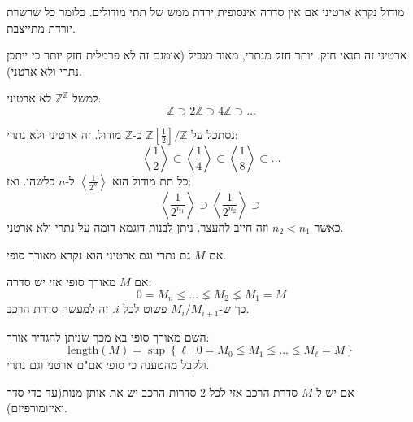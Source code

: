 \documentclass{tstextbook}
\begin{document}
\begin{definition}
מודול נקרא ארטיני אם אין סדרה אינסופית ירדת ממש של תתי מודולים. כלומר כל שרשרת יורדת מתייצבת.

\end{definition}
\begin{remark}
ארטיני זה תנאי חזק. יותר חזק מנתרי, מאוד מגביל (אומנם זה לא פרמלית חזק יותר כי ייתכן נתרי ולא ארטני).

\end{remark}
\begin{example}
למשל \(\mathbb{Z}^{\mathbb{Z}}\) לא ארטיני:
$$\mathbb{Z}\supset 2\mathbb{Z} \supset 4\mathbb{Z}\supset \dots$$

\end{example}
\begin{example}
נסתכל על \(\mathbb{Z}\left[ \frac{1}{2} \right] / \mathbb{Z}\) כ-\(\mathbb{Z}\) מודול. זה ארטיני ולא נתרי:
$$\left\langle  \frac{1}{2}  \right\rangle \subset \left\langle  \frac{1}{4}  \right\rangle \subset \left\langle  \frac{1}{8}  \right\rangle \subset \dots$$
כל תת מודול הוא \(\left\langle  \frac{1}{2^{n}}  \right\rangle\) ל-\(n\) כלשהו. ואז:
$$\left\langle  \frac{1}{2^{n_{1}}}  \right\rangle \supset \left\langle  \frac{1}{2^{n_{2}}}  \right\rangle\supset $$
כאשר \(n_{2}< n_{1}\) וזה חייב להעצר. ניתן לבנות דוגמא דומה על נתרי ולא ארטני.

\end{example}
\begin{definition}
אם \(M\) גם נתרי וגם ארטיני הוא נקרא מאורך סופי.

\end{definition}
\begin{proposition}
אם \(M\) מאורך סופי אזי יש סדרה:
$$0=M_{n}\leq  \dots \lneq M_{2} \lneq  M_{1}=M$$
כך ש-\(M_{i} / M_{i+1}\) פשוט לכל \(i\).  זה למעשה סדרת הרכב.

\end{proposition}
\begin{remark}
השם מאורך סופי בא מכך שניתן להגדיר אורך:
$$\mathrm{{length}}\left(M\right)=\operatorname*{sup}\left\{\ell\,|\,0=M_{0}\lneq M_{1}\lneq\ldots\lneq M_{\ell}=M\right\}$$
ולקבל מהטענה כי סופי אם"ם ארטני וגם נתרי.

\end{remark}
\begin{theorem}
אם יש ל-\(M\) סדרת הרכב אזי לכל 2 סדרות הרכב יש את אותן מנות(עד כדי סדר ואיזומורפיזם). 

\end{theorem}
\end{document}
